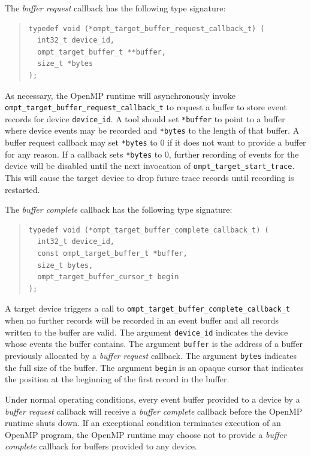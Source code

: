 \documentclass{article}
\begin{document}
The \emph{buffer request} callback has the following type signature:
\begin{quote}
\begin{lstlisting}
typedef void (*ompt_target_buffer_request_callback_t) (
  int32_t device_id,
  ompt_target_buffer_t **buffer,
  size_t *bytes
);
\end{lstlisting}
\end{quote}
As necessary, the OpenMP runtime will asynchronously invoke \lstinline|ompt_target_buffer_request_callback_t| to request a buffer to store event records for device \lstinline|device_id|.
A tool should set \lstinline|*buffer| to point to a buffer where device events may be recorded and \lstinline|*bytes| to the length of that buffer.
A buffer request callback  may set \lstinline|*bytes| to 0 if it does not want to provide a buffer for any reason. If a callback sets \lstinline|*bytes| to 0, further recording of events for the device will be disabled until the next invocation of \lstinline|ompt_target_start_trace|. This will cause the target device to drop future trace records until recording is restarted.

The \emph{buffer complete} callback has the following type signature: 
\begin{quote}
\begin{lstlisting}
typedef void (*ompt_target_buffer_complete_callback_t) (
  int32_t device_id, 
  const ompt_target_buffer_t *buffer,
  size_t bytes,
  ompt_target_buffer_cursor_t begin
);
\end{lstlisting}
\end{quote}
A target device triggers a call to \lstinline|ompt_target_buffer_complete_callback_t| when no further records will be recorded in an event buffer and all records written to the buffer are valid. 
The argument \lstinline|device_id| indicates the device whose events the buffer contains. The argument \lstinline|buffer| is the address of a buffer previously allocated by a \emph{buffer request} callback. The argument \lstinline|bytes| indicates the full size of the buffer. The argument \lstinline|begin| is an opaque cursor that indicates the position at the beginning of the first record in the buffer.

Under normal operating conditions, every event buffer provided to a device by a \emph{buffer request} callback will receive a \emph{buffer complete} callback before the OpenMP runtime shuts down. If an exceptional condition terminates  execution of an OpenMP program, the OpenMP runtime may choose not to provide a \emph{buffer complete} callback for buffers provided to any device.
\end{document}
